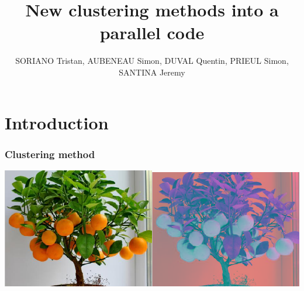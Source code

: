 \documentclass[10p]{beamer}
\date{}
\title{New clustering methods into a parallel code}
\author[SORIANO, AUBENEAU, DUVAL, PRIEUL, SANTINA]{SORIANO Tristan, AUBENEAU Simon, DUVAL Quentin, PRIEUL Simon, SANTINA Jeremy}
\institute{ENSEEIHT, 3IN}
\begin{document}
\begin{frame}
\maketitle
\end{frame}
\section{Introduction}
\begin{frame}
\frametitle{Clustering method}
\includegraphics[width=0.5\textwidth]{Image/Oranger.png}\includegraphics[width=0.5\textwidth]{Image/OrangerClust.png}
\end{frame}
\end{document}
